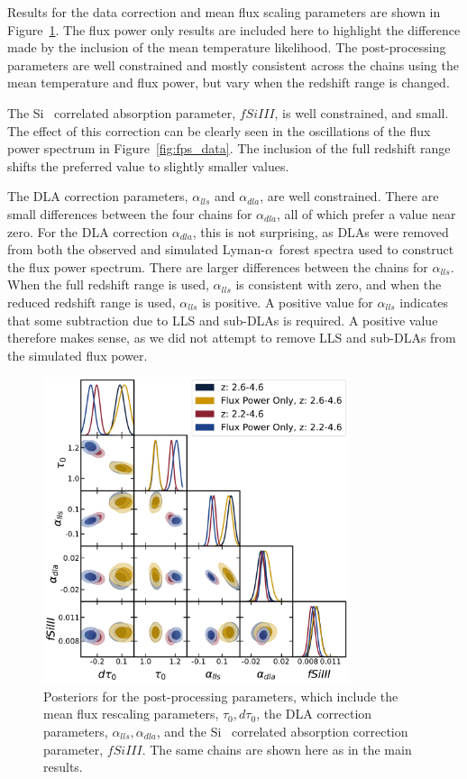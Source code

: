 \documentclass[a4paper,11pt]{article}
\newcommand{\lya}{Lyman-$\alpha$\ }
\begin{document}
Results for the data correction and mean flux scaling parameters are shown in Figure~\ref{fig:post_processing}.
The flux power only results are included here to highlight the difference made by the inclusion of the mean temperature likelihood.
The post-processing parameters are well constrained and mostly consistent across the chains using the mean temperature and flux power, but vary when the redshift range is changed.

The Si~{} correlated absorption parameter, $fSiIII$, is well constrained, and small.
The effect of this correction can be clearly seen in the oscillations of the flux power spectrum in Figure~\ref{fig:fps_data}.
The inclusion of the full redshift range shifts the preferred value to slightly smaller values.

The DLA correction parameters, $\alpha_{lls}$ and $\alpha_{dla}$, are well constrained.
There are small differences between the four chains for $\alpha_{dla}$, all of which prefer a value near zero.
For the DLA correction $\alpha_{dla}$, this is not surprising, as DLAs were removed from both the observed and simulated \lya forest spectra used to construct the flux power spectrum.
There are larger differences between the chains for $\alpha_{lls}$.
When the full redshift range is used, $\alpha_{lls}$ is consistent with zero, and when the reduced redshift range is used, $\alpha_{lls}$ is positive.
A positive value for $\alpha_{lls}$ indicates that some subtraction due to LLS and sub-DLAs is required.
A positive value therefore makes sense, as we did not attempt to remove LLS and sub-DLAs from the simulated flux power.


\begin{figure}
    \centering
    \includegraphics[width=0.8\textwidth]{figures/postp_corner.pdf}
    \caption{\label{fig:post_processing}
    Posteriors for the post-processing parameters, which include the mean flux rescaling parameters, $\tau_0, d\tau_0$, the DLA correction parameters, $\alpha_{lls}, \alpha_{dla}$, and the Si~{} correlated absorption correction parameter, $fSiIII$.
    The same chains are shown here as in the main results.
    }
\end{figure}
\end{document}
